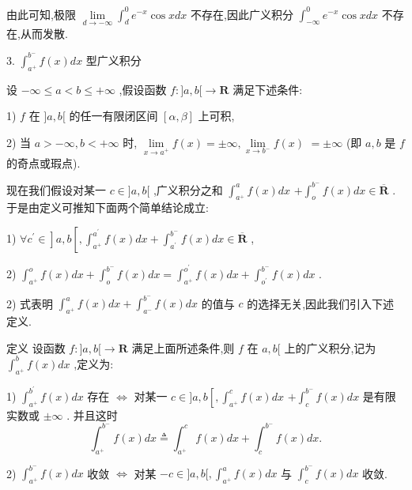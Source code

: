 由此可知,极限 $\mathop{\lim }\limits_{{d \rightarrow   - \infty }}{\int }_{d}^{0}{e}^{-x}\cos {xdx}$ 不存在,因此广义积分 ${\int }_{-\infty }^{0}{e}^{-x}\cos {xdx}$ 不存在,从而发散.

3. ${\int }_{{a}^{ + }}^{{b}^{ - }}f\left( x\right) {dx}$ 型广义积分

设 $- \infty  \leq  a < b \leq   + \infty$ ,假设函数 $f : \rbrack a,b\lbrack  \rightarrow  \mathbf{R}$ 满足下述条件:

1) $f$ 在 $\rbrack a,b\lbrack$ 的任一有限闭区间 $\left\lbrack  {\alpha ,\beta }\right\rbrack$ 上可积,

2) 当 $a >  - \infty ,b <  + \infty$ 时, $\mathop{\lim }\limits_{{x \rightarrow  {a}^{ + }}}f\left( x\right)  =  \pm  \infty ,\mathop{\lim }\limits_{{x \rightarrow  {b}^{ - }}}f\left( x\right)$  $=  \pm  \infty$ (即 $a,b$ 是 $f$ 的奇点或瑕点).

现在我们假设对某一 $c \in  \rbrack a,b\lbrack$ ,广义积分之和 ${\int }_{{a}^{ + }}^{a}f\left( x\right) {dx}$  $+ {\int }_{o}^{{b}^{ - }}f\left( x\right) {dx} \in  \overline{\mathbf{R}}$ . 于是由定义可推知下面两个简单结论成立:

1) $\left. {\forall {c}^{\prime } \in  }\right\rbrack  a,b\left\lbrack  \right. ,{\int }_{{a}^{ + }}^{{a}^{\prime }}f\left( x\right) {dx} + {\int }_{{a}^{\prime }}^{{b}^{ - }}f\left( x\right) {dx} \in  \overline{\mathbf{R}}$ ,

2) ${\int }_{{a}^{ + }}^{o}f\left( x\right) {dx} + {\int }_{o}^{{b}^{ - }}f\left( x\right) {dx} = {\int }_{{a}^{ + }}^{{o}^{\prime }}f\left( x\right) {dx} + {\int }_{{o}^{\prime }}^{{b}^{ - }}f\left( x\right) {dx}$ .

2) 式表明 ${\int }_{{a}^{ + }}^{a}f\left( x\right) {dx} + {\int }_{{a}^{ - }}^{{b}^{ - }}f\left( x\right) {dx}$ 的值与 $c$ 的选择无关,因此我们引入下述定义.

定义 设函数 $f : \rbrack a,b\lbrack  \rightarrow  \mathbf{R}$ 满足上面所述条件,则 $f$ 在 $a,b\lbrack$ 上的广义积分,记为 ${\int }_{{a}^{ + }}^{b}f\left( x\right) {dx}$ ,定义为:

1) ${\int }_{{a}^{ + }}^{{b}^{\prime }}f\left( x\right) {dx}$ 存在 $\Leftrightarrow$ 对某一 $c \in  \rbrack a,b\left\lbrack  \right. ,{\int }_{{a}^{ + }}^{c}f\left( x\right) {dx}$  $+ {\int }_{c}^{{b}^{ - }}f\left( x\right) {dx}$ 是有限实数或 $\pm  \infty$ . 并且这时
$${\int }_{{a}^{ + }}^{{b}^{ - }}f\left( x\right) {dx} \triangleq  {\int }_{{a}^{ + }}^{c}f\left( x\right) {dx} + {\int }_{c}^{{b}^{ - }}f\left( x\right) {dx}.$$

2) ${\int }_{{a}^{ + }}^{{b}^{ - }}f\left( x\right) {dx}$ 收敛 $\Leftrightarrow$ 对某 $- c \in  \rbrack a,b\lbrack ,{\int }_{{a}^{ + }}^{a}f\left( x\right) {dx}$ 与 ${\int }_{c}^{{b}^{ - }}f\left( x\right) {dx}$ 收敛.

